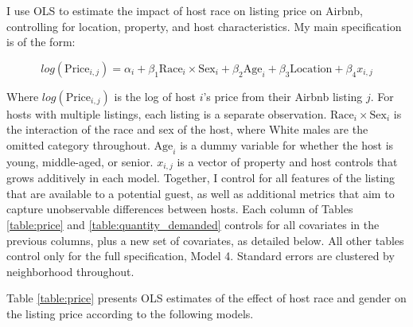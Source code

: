 
I use OLS to estimate the impact of host race on listing price on Airbnb, controlling for location, property, and host characteristics. My main specification is of the form:

\[ log(\text{Price}_{i,j}) = \alpha_i + \beta_1 \text{Race}_{i} \times \text{Sex}_i + \beta_2 \text{Age}_i + \beta_3 \text{Location} +  \beta_4 x_{i,j} \]

Where $log(\text{Price}_{i,j})$ is the log of host $i$'s price from their Airbnb listing $j$. For hosts with multiple listings, each listing is a separate observation. $\text{Race}_{i}  \times \text{Sex}_i$ is the interaction of the race and sex of the host, where White males are the omitted category throughout. $\text{Age}_i$ is a dummy variable for whether the host is young, middle-aged, or senior. $x_{i,j}$ is a vector of property and host controls that grows additively in each model. Together, I control for all features of the listing that are available to a potential guest, as well as additional metrics that aim to capture unobservable differences between hosts. Each column of Tables \ref{table:price} and \ref{table:quantity_demanded} controls for all covariates in the previous columns, plus a new set of covariates, as detailed below. All other tables control only for the full specification, Model 4. Standard errors are clustered by neighborhood throughout.

Table \ref{table:price} presents OLS estimates of the effect of host race and gender on the listing price according to the following models. 

